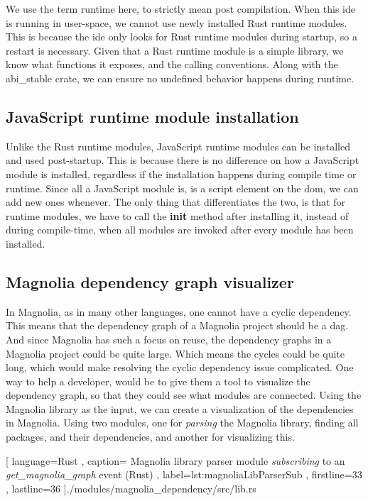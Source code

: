 We use the term runtime here, to strictly mean post compilation. When this
\gls*{ide} is running in user-space, we cannot use newly installed Rust
runtime modules. This is because the \gls*{ide} only looks for Rust runtime
modules during startup, so a restart is necessary. Given that a Rust runtime
module is a simple library, we know what functions it exposes, and the calling
conventions. Along with the abi\_stable crate, we can ensure no undefined
behavior happens during runtime.


\subsection{JavaScript runtime module installation}

Unlike the Rust runtime modules, JavaScript runtime modules can be installed and
used post-startup. This is because there is no difference on how a JavaScript
module is installed, regardless if the installation happens during compile time
or runtime. Since all a JavaScript module is, is a script element on the
\gls*{dom}, we can add new ones whenever. The only thing that differentiates the
two, is that for runtime modules, we have to call the \textbf{init} method after
installing it, instead of during compile-time, when all modules are invoked
after every module has been installed.


\subsection{Magnolia dependency graph visualizer}

In Magnolia, as in many other languages, one cannot have a cyclic dependency.
This means that the dependency graph of a Magnolia project should be a
\gls*{dag}. And since Magnolia has such a focus on reuse, the dependency graphs
in a Magnolia project could be quite large. Which means the cycles could be
quite long, which would make resolving the cyclic dependency issue complicated.
One way to help a developer, would be to give them a tool to visualize the
dependency graph, so that they could see what modules are connected. Using the
Magnolia library as the input, we can create a visualization of the dependencies
in Magnolia. Using two modules, one for \textit{parsing} the Magnolia library,
finding all packages, and their dependencies, and another for visualizing
this.

\begin{code}[H]
  
    [ language=Rust
    , caption={
      Magnolia library parser module \textit{subscribing} to an
      \textit{get\_magnolia\_graph } event (Rust)
    }
    , label=lst:magnoliaLibParserSub
    , firstline=33
    , lastline=36
    ]{./modules/magnolia\_dependency/src/lib.rs}
\end{code}

